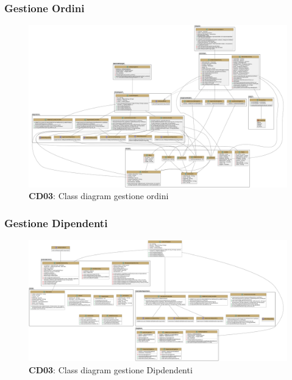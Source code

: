     \subsubsection{Gestione Ordini}
        \begin{figure}[H]
            \centering
            \includegraphics[scale=0.15]{assets/diagrammi/Class diagram di design/Class Diagramm Design Gestione Ordini.png}
            \caption*{\textbf{CD03}: Class diagram gestione ordini}\label{fig:ClassDiagram_ManageOrders}
        \end{figure}

    \subsubsection{Gestione Dipendenti}
        \begin{figure}[H]
            \centering
            \includegraphics[scale=0.15]{assets/diagrammi/Class diagram di design/gestione dipendenti.png}
            \caption*{\textbf{CD03}: Class diagram gestione Dipdendenti}\label{fig:ClassDiagram_ManageWorkers}
        \end{figure}


